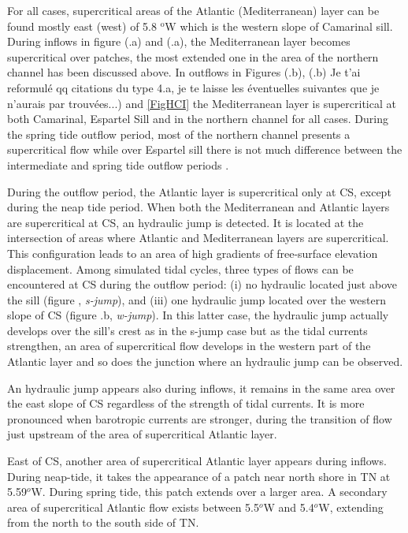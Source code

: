 For all cases, \color{blue} supercritical areas \color{black}  of the Atlantic (Mediterranean) layer \color{blue} can be found \color{black} mostly east (west) of 5.8 $^\text{o}$W which is the western slope of Camarinal sill. During inflows in figure  \color{blue}(.a) and (.a), the Mediterranean layer becomes supercritical over patches, the most extended one in the area of the northern channel has been discussed above. In outflows in Figures (.b), (.b) \color{green} Je t'ai reformulé qq citations du type 4.a, je te laisse les éventuelles suivantes que je n'aurais par trouvées...) \color{black} and \ref{FigHCI} the Mediterranean layer is supercritical at both Camarinal, Espartel Sill and in the northern channel for all cases.  \color{blue}During the spring tide outflow period, most of the northern channel presents a supercritical flow while over Espartel sill there is not much difference between the intermediate and spring tide outflow periods \color{black}.

\color{blue}During the outflow period, the Atlantic layer is supercritical only at CS, except during the neap tide period. When both the Mediterranean and Atlantic layers are supercritical at CS, an hydraulic jump is detected. It is located at the intersection of areas where Atlantic and Mediterranean layers are supercritical. This configuration leads to an area of high gradients of free-surface elevation displacement. Among simulated tidal cycles, three types of flows can be encountered at CS during the outflow period: (i) no hydraulic located just above the sill (figure , \textit{s-jump}), and (iii) one hydraulic jump located over the western slope of CS (figure .b, \textit{w-jump}). In this latter case, the hydraulic jump actually develops \color{black} over the sill's crest as in the s-jump case but as the tidal currents strengthen, \color{blue} an area of supercritical flow develops in the western part of the Atlantic layer and so does the junction where an hydraulic jump can be observed.\color{black} 

\color{blue}An hydraulic jump appears also during inflows, it remains in the same area over the east slope of CS regardless of the strength of tidal currents. It is more pronounced when barotropic currents are stronger, during the transition of flow just upstream of the area of supercritical Atlantic layer. \color{black}

East of CS, another area of supercritical Atlantic layer appears during inflows.  \color{blue}During neap-tide, \color{black} it takes the appearance of a patch near north shore in TN at 5.59$^o$W. During spring tide, this patch extends over a larger area. A secondary area of supercritical Atlantic flow exists between 5.5$^o$W and 5.4$^o$W, extending from the north to the south side of TN. \color{black} 

